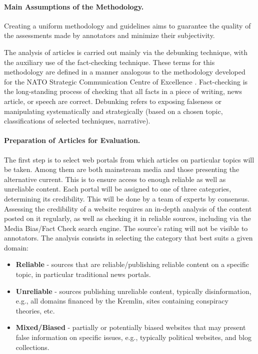 \documentclass[11pt]{article}
\begin{document}
\paragraph{Main Assumptions of the Methodology.}
Creating a uniform methodology and guidelines aims to guarantee the quality of the assessments made by annotators and minimize their subjectivity. 

The analysis of articles is carried out mainly via the debunking technique, with the auxiliary use of the fact-checking technique. These terms for this methodology are defined in a manner analogous to the methodology developed for the NATO Strategic Communication Centre of Excellence \cite{pamment2021fact}. Fact-checking is the long-standing process of checking that all facts in a piece of writing, news article, or speech are correct. Debunking refers to exposing falseness or manipulating systematically and strategically (based on a chosen topic, classifications of selected techniques, narrative). 

\paragraph{Preparation of Articles for Evaluation.} The first step is to select web portals from which articles on particular topics will be taken. Among them are both mainstream media and those presenting the alternative current. This is to ensure access to enough reliable as well as unreliable content. Each portal will be assigned to one of three categories, determining its credibility. This will be done by a team of experts by consensus. Assessing the credibility of a website requires an in-depth analysis of the content posted on it regularly, as well as checking it in reliable sources, including via the Media Bias/Fact Check search engine. The source's rating will not be visible to annotators. The analysis consists in selecting the category that best suits a given domain:
\begin{itemize}[nosep, leftmargin=*]
    \item {\textbf{Reliable}} - sources that are reliable/publishing reliable content on a specific topic, in particular traditional news portals.
    \item {\textbf{Unreliable}} - sources publishing unreliable content, typically disinformation, e.g., all domains financed by the Kremlin, sites containing conspiracy theories, etc.
    \item {\textbf{Mixed/Biased}} - partially or potentially biased websites that may present false information on specific issues, e.g., typically political websites, and blog collections.
\end{itemize}
\end{document}
